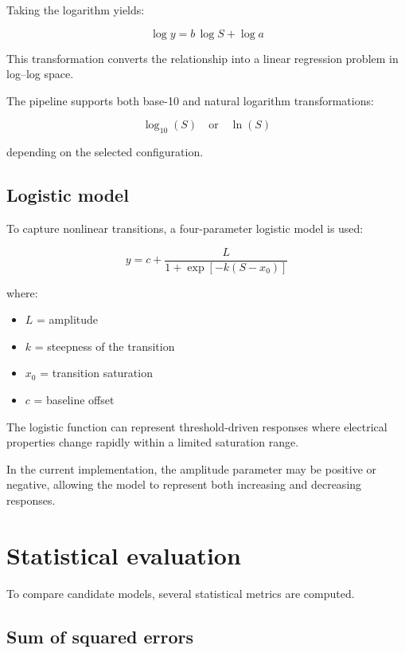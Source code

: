 \documentclass[11pt]{article}
\begin{document}
Taking the logarithm yields:

\[
\log y = b\,\log S + \log a
\]

This transformation converts the relationship into a linear regression problem in log–log space.

The pipeline supports both base-10 and natural logarithm transformations:

\[
\log_{10}(S) \quad \text{or} \quad \ln(S)
\]

depending on the selected configuration.

\subsection{Logistic model}

To capture nonlinear transitions, a four-parameter logistic model is used:

\[
y = c + \frac{L}{1 + \exp[-k(S-x_0)]}
\]

where:

\begin{itemize}

\item $L$ = amplitude

\item $k$ = steepness of the transition

\item $x_0$ = transition saturation

\item $c$ = baseline offset

\end{itemize}

The logistic function can represent threshold-driven responses where electrical properties change rapidly within a limited saturation range.

In the current implementation, the amplitude parameter may be positive or negative, allowing the model to represent both increasing and decreasing responses.

\section{Statistical evaluation}

To compare candidate models, several statistical metrics are computed.

\subsection{Sum of squared errors}
\end{document}
